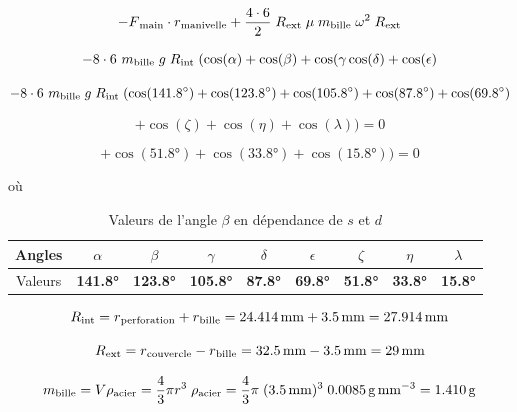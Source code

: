 \[-F\textsubscript{main} \cdot r\textsubscript{manivelle} + \frac{4\cdot 6}{2}\; R\textsubscript{ext}\; \mu \;m\textsubscript{bille} \;\omega^{2}\; R\textsubscript{ext}\]

\[- 8\cdot 6 \ m\textsubscript{bille}\; g\; R\textsubscript{int} \; (\cos(\alpha) + \cos(\beta) + \cos(\gamma \cos(\delta) + \cos(\epsilon)\]

\[- 8\cdot 6 \ m\textsubscript{bille}\; g\; R\textsubscript{int} \; (\cos(\ang{141.8}) + \cos(\ang{123.8}) + \cos(\ang{105.8}) + \cos(\ang{87.8}) + \cos(\ang{69.8})\]

\begin{equation}
    + \cos(\zeta) + \cos(\eta) + \cos(\lambda)) = 0
\label{eq:moments_de_force_en_jeu}
\end{equation}

\begin{equation}
    + \cos(\ang{51.8}) + \cos(\ang{33.8}) + \cos(\ang{15.8})) = 0
\label{eq:moments_de_force_en_jeu}
\end{equation}

où 

\begin{table}[htbp]
    \centering
    \begin{tabular}{|c|c|c|c|c|c|c|c|c|}
        \hline
        Angles & $\alpha$ & $\beta$ & $\gamma$ & $\delta$ & $\epsilon$ & $\zeta$ & $\eta$ & $\lambda$\\
        \hline
        Valeurs & \textbf{\ang{141.8}} & \textbf{\ang{123.8}} & \textbf{\ang{105.8}} & \textbf{\ang{87.8}} & \textbf{\ang{69.8}} & \textbf{\ang{51.8}} & \textbf{\ang{33.8}} & \textbf{\ang{15.8}}\\
        \hline
    \end{tabular}
    \caption{Valeurs de l'angle $\beta$ en dépendance de $s$ et $d$}
\end{table}

\[R\textsubscript{int} = r\textsubscript{perforation} + r\textsubscript{bille} = \SI{24.414}{\milli\metre} + \SI{3.5}{\milli\metre} = \SI{27.914}{\milli\metre}\]

\[R\textsubscript{ext} = r\textsubscript{couvercle} - r\textsubscript{bille} = \SI{32.5}{\milli\metre} - \SI{3.5}{\milli\metre} = \SI{29}{\milli\metre}\]

\[m\textsubscript{bille} = V \rho\textsubscript{acier} = \frac{4}{3}\pi r^{3} \; \rho\textsubscript{acier} = \frac{4}{3} \pi \;(\SI{3.5}{\milli\metre})^{3} \; \SI{0.0085}{\g\per\mm\cubed} = \SI{1.410}{\g}\]

